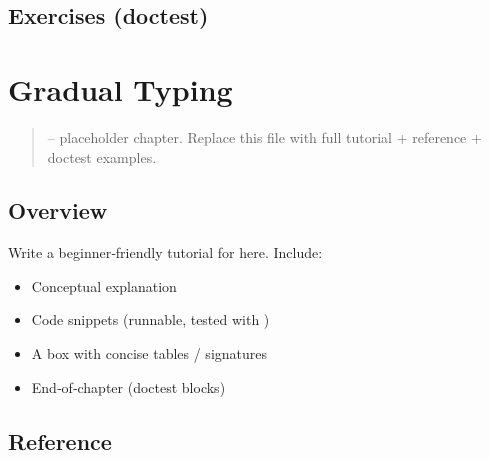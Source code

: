\documentclass[a4paper,11pt,english]{sphinxmanual}
\begin{document}
\subsection{Exercises (doctest)}
\label{\detokenize{typing/ci_integration:exercises-doctest}}
\begin{sphinxVerbatim}[commandchars=\\\{\}]
\end{sphinxVerbatim}

\sphinxstepscope


\section{Gradual Typing}
\label{\detokenize{typing/gradual_typing:gradual-typing}}\label{\detokenize{typing/gradual_typing::doc}}\begin{quote}

\sphinxAtStartPar
{} – placeholder chapter. Replace this file with full tutorial + reference + doctest examples.
\end{quote}


\subsection{Overview}
\label{\detokenize{typing/gradual_typing:overview}}
\sphinxAtStartPar
Write a beginner‑friendly tutorial for  here. Include:
\begin{itemize}
\item {} 
\sphinxAtStartPar
Conceptual explanation

\item {} 
\sphinxAtStartPar
Code snippets (runnable, tested with )

\item {} 
\sphinxAtStartPar
A  box with concise tables / signatures

\item {} 
\sphinxAtStartPar
End‑of‑chapter  (doctest blocks)

\end{itemize}


\subsection{Reference}
\label{\detokenize{typing/gradual_typing:reference}}
\end{document}
